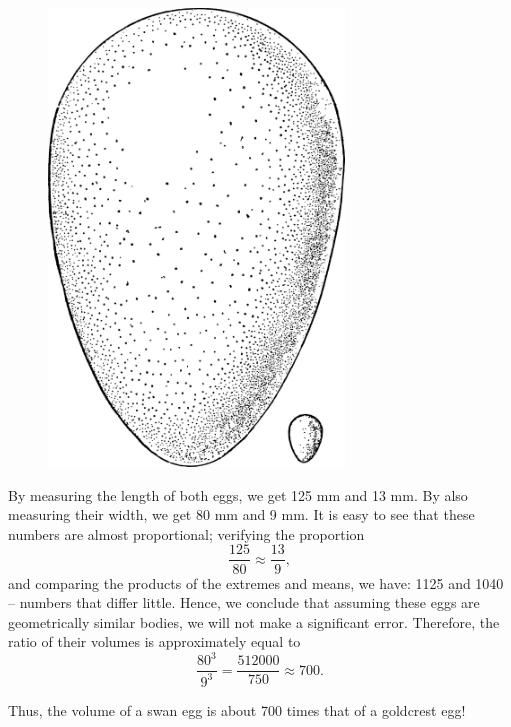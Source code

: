 \begin{figure}[h!]
\centering
\includegraphics[width=0.7\textwidth]{figures/ch-11/fig-168.pdf}
\end{figure}

\ans By measuring the length of both eggs, we get 125 mm and 13 mm. By also measuring their width, we get 80 mm and 9 mm. It is easy to see that these numbers are almost proportional; verifying the proportion
\begin{equation*}%
\frac{125}{80} \approx \frac{13}{9},
\end{equation*}
and comparing the products of the extremes and means, we have: 1125 and 1040 -- numbers that differ little. Hence, we conclude that assuming these eggs are geometrically similar bodies, we will not make a significant error. Therefore, the ratio of their volumes is approximately equal to
\begin{equation*}%
\frac{80^3}{9^3} = \frac{512000}{750} \approx 700.
\end{equation*}

Thus, the volume of a swan egg is about 700 times that of a goldcrest egg!

